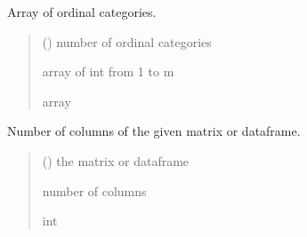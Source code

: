 \documentclass[letterpaper,10pt,english]{sphinxmanual}
\begin{document}
\begin{fulllineitems}
\label{\detokenize{cubmods:cubmods.general.choices}}
\pysigstartsignatures
{}
\pysigstopsignatures
\sphinxAtStartPar
Array of ordinal categories.
\begin{quote}\begin{description}
\sphinxAtStartPar
{} () \textendash{} number of ordinal categories

\sphinxAtStartPar
array of int from 1 to m

\sphinxAtStartPar
array

\end{description}\end{quote}

\end{fulllineitems}


\begin{fulllineitems}
\label{\detokenize{cubmods:cubmods.general.colsof}}
\pysigstartsignatures
{}
\pysigstopsignatures
\sphinxAtStartPar
Number of columns of the given
matrix or dataframe.
\begin{quote}\begin{description}
\sphinxAtStartPar
{} (\sphinxstyleliteralemphasis{\sphinxupquote{, }}) \textendash{} the matrix or dataframe

\sphinxAtStartPar
number of columns

\sphinxAtStartPar
int

\end{description}\end{quote}

\end{fulllineitems}

\end{document}
